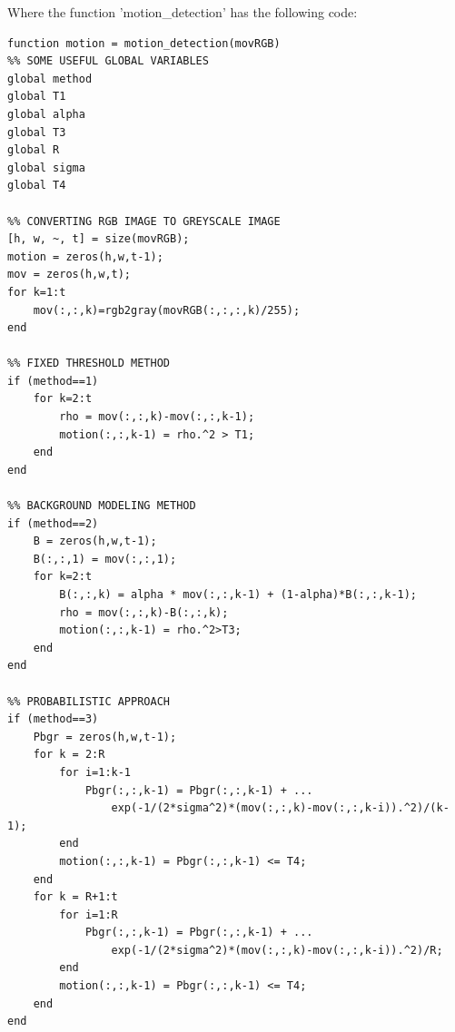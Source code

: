 \documentclass[11pt]{article}
\begin{document}
Where the function 'motion\_detection' has the following code:
\begin{lstlisting}
function motion = motion_detection(movRGB)
%% SOME USEFUL GLOBAL VARIABLES
global method
global T1
global alpha
global T3
global R
global sigma
global T4

%% CONVERTING RGB IMAGE TO GREYSCALE IMAGE
[h, w, ~, t] = size(movRGB);
motion = zeros(h,w,t-1);
mov = zeros(h,w,t);
for k=1:t
    mov(:,:,k)=rgb2gray(movRGB(:,:,:,k)/255);
end

%% FIXED THRESHOLD METHOD
if (method==1)
    for k=2:t
        rho = mov(:,:,k)-mov(:,:,k-1);
        motion(:,:,k-1) = rho.^2 > T1;
    end
end

%% BACKGROUND MODELING METHOD
if (method==2)
    B = zeros(h,w,t-1);
    B(:,:,1) = mov(:,:,1);
    for k=2:t
        B(:,:,k) = alpha * mov(:,:,k-1) + (1-alpha)*B(:,:,k-1);
        rho = mov(:,:,k)-B(:,:,k);
        motion(:,:,k-1) = rho.^2>T3;
    end
end

%% PROBABILISTIC APPROACH
if (method==3)
    Pbgr = zeros(h,w,t-1);
    for k = 2:R
        for i=1:k-1
            Pbgr(:,:,k-1) = Pbgr(:,:,k-1) + ...
                exp(-1/(2*sigma^2)*(mov(:,:,k)-mov(:,:,k-i)).^2)/(k-1);
        end
        motion(:,:,k-1) = Pbgr(:,:,k-1) <= T4;
    end
    for k = R+1:t
        for i=1:R
            Pbgr(:,:,k-1) = Pbgr(:,:,k-1) + ...
                exp(-1/(2*sigma^2)*(mov(:,:,k)-mov(:,:,k-i)).^2)/R;
        end
        motion(:,:,k-1) = Pbgr(:,:,k-1) <= T4;
    end
end
\end{lstlisting}
\end{document}
